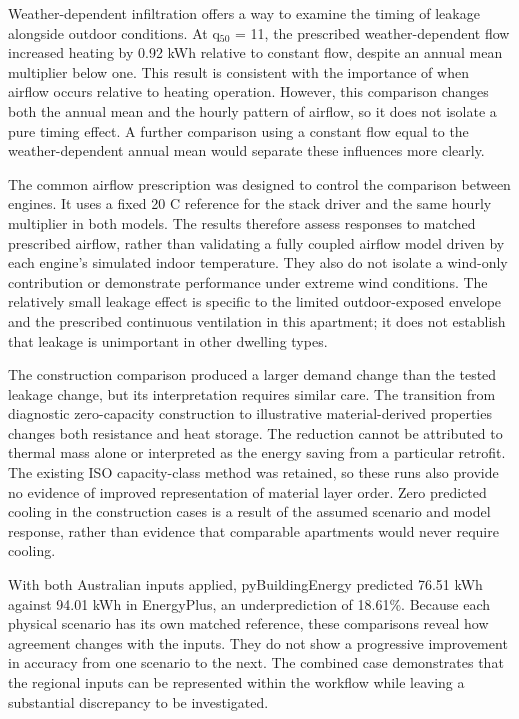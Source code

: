 Weather-dependent infiltration offers a way to examine the timing of leakage alongside outdoor conditions. At q$_{50}$ = 11, the prescribed weather-dependent flow increased heating by 0.92 kWh relative to constant flow, despite an annual mean multiplier below one. This result is consistent with the importance of when airflow occurs relative to heating operation. However, this comparison changes both the annual mean and the hourly pattern of airflow, so it does not isolate a pure timing effect. A further comparison using a constant flow equal to the weather-dependent annual mean would separate these influences more clearly.

The common airflow prescription was designed to control the comparison between engines. It uses a fixed 20 \textdegree C reference for the stack driver and the same hourly multiplier in both models. The results therefore assess responses to matched prescribed airflow, rather than validating a fully coupled airflow model driven by each engine's simulated indoor temperature. They also do not isolate a wind-only contribution or demonstrate performance under extreme wind conditions. The relatively small leakage effect is specific to the limited outdoor-exposed envelope and the prescribed continuous ventilation in this apartment; it does not establish that leakage is unimportant in other dwelling types.

The construction comparison produced a larger demand change than the tested leakage change, but its interpretation requires similar care. The transition from diagnostic zero-capacity construction to illustrative material-derived properties changes both resistance and heat storage. The reduction cannot be attributed to thermal mass alone or interpreted as the energy saving from a particular retrofit. The existing ISO capacity-class method was retained, so these runs also provide no evidence of improved representation of material layer order. Zero predicted cooling in the construction cases is a result of the assumed scenario and model response, rather than evidence that comparable apartments would never require cooling.

With both Australian inputs applied, pyBuildingEnergy predicted 76.51 kWh against 94.01 kWh in EnergyPlus, an underprediction of 18.61\%. Because each physical scenario has its own matched reference, these comparisons reveal how agreement changes with the inputs. They do not show a progressive improvement in accuracy from one scenario to the next. The combined case demonstrates that the regional inputs can be represented within the workflow while leaving a substantial discrepancy to be investigated.


